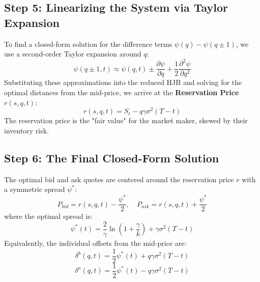 \subsection{Step 5: Linearizing the System via Taylor Expansion}
To find a closed-form solution for the difference terms $\psi(q) - \psi(q \pm 1)$, we use a second-order Taylor expansion around $q$:
\begin{equation}
    \psi(q \pm 1, t) \approx \psi(q, t) \pm \frac{\partial \psi}{\partial q} + \frac{1}{2} \frac{\partial^2 \psi}{\partial q^2}
\end{equation}
Substituting these approximations into the reduced HJB and solving for the optimal distances from the mid-price, we arrive at the \textbf{Reservation Price} $r(s, q, t)$:
\begin{equation}
    r(s, q, t) = S_t - q \gamma \sigma^2 (T - t)
\end{equation}
The reservation price is the "fair value" for the market maker, skewed by their inventory risk.

\subsection{Step 6: The Final Closed-Form Solution}
The optimal bid and ask quotes are centered around the reservation price $r$ with a symmetric spread $\psi^*$:
\begin{equation}
    P_{bid} = r(s, q, t) - \frac{\psi^*}{2}, \quad P_{ask} = r(s, q, t) + \frac{\psi^*}{2}
\end{equation}
where the optimal spread is:
\begin{equation}
    \psi^*(t) = \frac{2}{\gamma} \ln \left( 1 + \frac{\gamma}{k} \right) + \gamma \sigma^2 (T - t)
\end{equation}
Equivalently, the individual offsets from the mid-price are:
\begin{equation}
    \delta^b(q, t) = \frac{1}{2} \psi^*(t) + q \gamma \sigma^2 (T - t)
\end{equation}
\begin{equation}
    \delta^a(q, t) = \frac{1}{2} \psi^*(t) - q \gamma \sigma^2 (T - t)
\end{equation}

